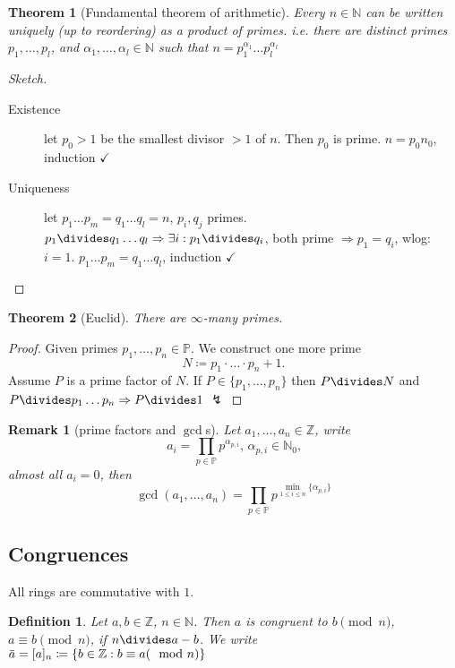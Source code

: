 \documentclass[a4paper]{article}
\newtheorem{defi}{Definition}
\newtheorem{rem}{Remark}
\newtheorem{theorem}{Theorem}
\newcommand{\N}{\mathbb{N}}
\newcommand{\Z}{\mathbb{Z}}
\newcommand{\PP}{\mathbb{P}}
\newcommand{\overbar}[1]{\mkern 1.5mu\overline{\mkern-1.5mu#1\mkern-1.5mu}\mkern 1.5mu}
\begin{document}
\begin{theorem}[Fundamental theorem of arithmetic]
Every $n \in \N$ can be written uniquely (up to reordering) as a product of primes.
i.e. there are distinct primes $p_1,\dots,p_l$, and $\alpha_1,\dots,\alpha_l \in \N$ such that
$n = p_1^{\alpha_1} \dots p_l^{\alpha_l}$
\end{theorem}

\begin{proof}[Sketch]\hfill{}
  \begin{description}
    \item[Existence]
      let $p_0 > 1$ be the smallest divisor $> 1$ of $n$. Then $p_0$ is prime.
      $n = p_0 n_0$, induction $\checkmark$

    \item[Uniqueness]
      let $p_1 \dots p_m = q_1 \dots q_l = n$, $p_i, q_j$ primes.
      $p_1 \divides  q_1 \dots q_l \Rightarrow \exists i: p_1\divides q_i$, both prime $\Rightarrow p_1 = q_i$, wlog: $i = 1$.
      $p_1\dots p_m = q_1 \dots q_l$, induction $\checkmark$
  \end{description}
\end{proof}

\begin{theorem}[Euclid]
There are $\infty$-many primes.
\end{theorem}

\begin{proof}
  Given primes $p_1,\dots,p_n \in \PP$. We construct one more prime \[N \coloneq p_1 \cdot \dots \cdot p_n + 1 \text{.}\]
  Assume $P$ is a prime factor of $N$.
  If $P \in \{p_1, \dots ,p_n\}$ then $P\divides N$ and $P\divides p_1\dots p_n \Rightarrow P\divides 1$ $\lightning$
\end{proof}

\begin{rem}[prime factors and $\gcd$s]
Let $a_1,\dots, a_n \in \Z$, write
\[a_i = \prod_{p \in \PP} p^{\alpha_{p,i}}\text{, }\alpha_{p,i} \in \N_0 \text{,}\] almost all $a_i = 0$,
then \[\gcd(a_1,\dots,a_n) = \prod_{p \in \PP} p^{\min_{1\leq i\leq n} \{\alpha_{p,i}\}}\]
\end{rem}

\subsection{Congruences}

All rings are commutative with $1$.

\begin{defi}
Let $a,b \in \Z$, $n \in \N$. Then \emph{$a$ is congruent to $b \pmod{n}$}, $a \equiv b \pmod{n}$,
if $n\divides  a-b$.
We write $\overbar{a} = [a]_n \coloneq \{b \in \Z : b \equiv a (\mod n)\}$
\end{defi}
\end{document}
